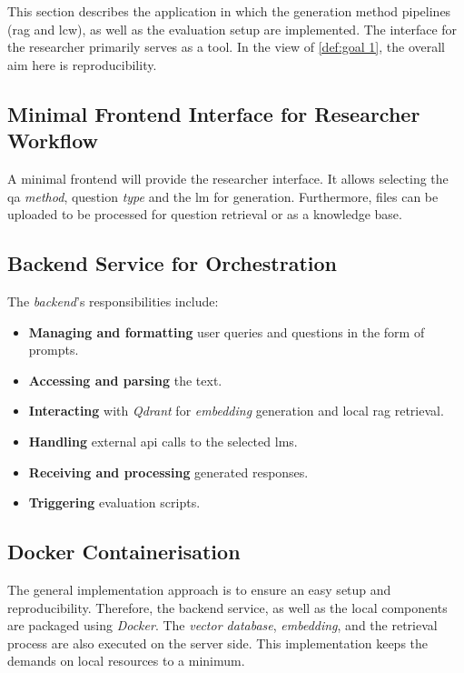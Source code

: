 This section describes the application in which the generation method pipelines (\ac{rag} and \ac{lcw}), as well as the evaluation setup are implemented.
The interface for the researcher primarily serves as a tool.
In the view of \cref{def:goal 1}, the overall aim here is reproducibility. 
%
\subsection[Frontend Interface]{Minimal Frontend Interface for Researcher Workflow}\label{subsec:frontend_interface}
%
A minimal frontend will provide the researcher interface.
It allows selecting the \ac{qa} \textit{method}, question \textit{type} and the \ac{lm} for generation.
Furthermore, files can be uploaded to be processed for question retrieval or as a knowledge base.
%
\subsection{Backend Service for Orchestration}\label{subsec:backend_service} 
    The \textit{backend}'s responsibilities include:
    \begin{itemize}
        \item \textbf{Managing and formatting} user queries and questions in the form of prompts.
        \item \textbf{Accessing and parsing} the \citet{bb2} text.
        \item \textbf{Interacting} with \textit{Qdrant} for \textit{embedding} generation and local \ac{rag} retrieval.
        \item \textbf{Handling} external \ac{api} calls to the selected \acp{lm}.
        \item \textbf{Receiving and processing} generated responses.
        \item \textbf{Triggering} evaluation scripts.
    \end{itemize}
\subsection{Docker Containerisation}\label{subsec:docker}

The general implementation approach is to ensure an easy setup and reproducibility.
Therefore, the backend service, as well as the local components are packaged using \textit{Docker}.
The \textit{vector database}, \textit{embedding}, and the retrieval process are also executed on the server side.
This implementation keeps the demands on local resources to a minimum.
%
